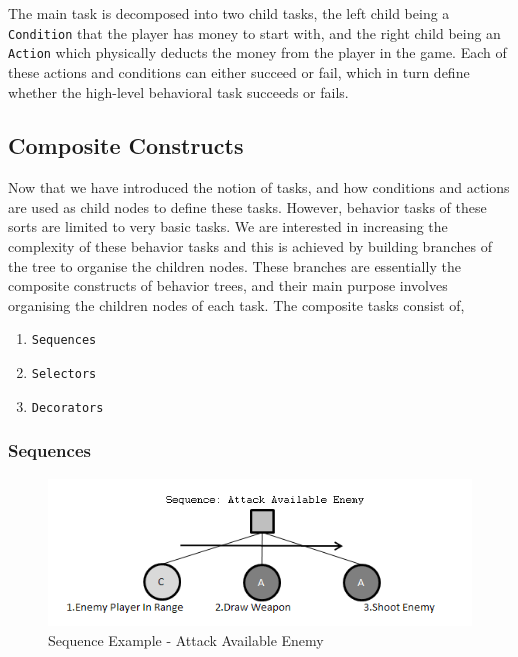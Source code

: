             \noindent The main task is decomposed into two child tasks, the left child being a \texttt{Condition} that the player has money to start with, and the right child being an \texttt{Action} which physically deducts the money from the player in the game. Each of these actions and conditions can either succeed or fail, which in turn define whether the high-level behavioral task succeeds or fails. 
                        
            \newpage
            
            \subsection{Composite Constructs}
            
            Now that we have introduced the notion of tasks, and how conditions and actions are used as child nodes to define these tasks. However, behavior tasks of these sorts are limited to very basic tasks. We are interested in increasing the complexity of these behavior tasks and this is achieved by building branches of the tree to organise the children nodes. These branches are essentially the composite constructs of behavior trees, and their main purpose involves organising the children nodes of each task. The composite tasks consist of,
            
            \begin{enumerate}
            \item \texttt{Sequences} 
            \item \texttt{Selectors} 
            \item \texttt{Decorators}
            \end{enumerate}
            
                    
            \subsubsection{Sequences}
            
            \begin{figure}[h]
                
                \begin{center}
                \includegraphics[scale=0.5]{images/sequence.png}
                \caption{Sequence Example - Attack Available Enemy}
                \label{img:sequence}
                \end{center}            
            \end{figure} 
            
